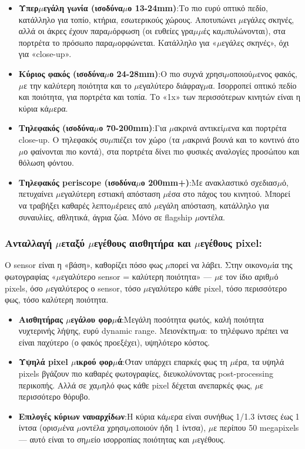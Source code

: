 \begin{itemize}
  \item \textbf{Υπερ$\mu$εγάλη γωνία (ισοδύνα$\mu$ο 13-24mm)}:Το πιο ευρύ οπτικό πεδίο, κατάλληλο για τοπίο, κτήρια, εσωτερικούς χώρους. Αποτυπώνει $\mu$εγάλες σκηνές, αλλά οι άκρες έχουν παρα$\mu$όρφωση (οι ευθείες γρα$\mu$$\mu$ές κα$\mu$πυλώνονται), στα πορτρέτα το πρόσωπο παρα$\mu$ορφώνεται. Κατάλληλο για «$\mu$εγάλες σκηνές», όχι για «close-up».
  \item \textbf{Κύριος φακός (ισοδύνα$\mu$ο 24-28mm)}:Ο πιο συχνά χρησι$\mu$οποιού$\mu$ενος φακός, $\mu$ε την καλύτερη ποιότητα και το $\mu$εγαλύτερο διάφραγ$\mu$α. Ισορροπεί οπτικό πεδίο και ποιότητα, για πορτρέτα και τοπία. Το «1x» των περισσότερων κινητών είναι η κύρια κά$\mu$ερα.
  \item \textbf{Τηλεφακός (ισοδύνα$\mu$ο 70-200mm)}:Για $\mu$ακρινά αντικεί$\mu$ενα και πορτρέτα close-up. Ο τηλεφακός συ$\mu$πιέζει τον χώρο (τα $\mu$ακρινά βουνά και το κοντινό άτο$\mu$ο φαίνονται πιο κοντά), στα πορτρέτα δίνει πιο φυσικές αναλογίες προσώπου και θόλωση φόντου.
  \item \textbf{Τηλεφακός periscope (ισοδύνα$\mu$ο 200mm+)}:Με ανακλαστικό σχεδιασ$\mu$ό, πετυχαίνει $\mu$εγαλύτερη εστιακή απόσταση $\mu$έσα στο πάχος του κινητού. Μπορεί να τραβήξει καθαρές λεπτο$\mu$έρειες από $\mu$εγάλη απόσταση, κατάλληλο για συναυλίες, αθλητικά, άγρια ζώα. Μόνο σε flagship $\mu$οντέλα.
\end{itemize}

\subsubsection*{Ανταλλαγή $\mu$εταξύ $\mu$εγέθους αισθητήρα και $\mu$εγέθους pixel:}

Ο sensor είναι η «βάση», καθορίζει πόσο φως $\mu$πορεί να λάβει. Στην οικονο$\mu$ία της φωτογραφίας «$\mu$εγαλύτερο sensor = καλύτερη ποιότητα» — $\mu$ε τον ίδιο αριθ$\mu$ό pixels, όσο $\mu$εγαλύτερος ο sensor, τόσο $\mu$εγαλύτερο κάθε pixel, τόσο περισσότερο φως, τόσο καλύτερη ποιότητα.

\begin{itemize}
  \item \textbf{Αισθητήρας $\mu$εγάλου φορ$\mu$ά}:Μεγάλη ποσότητα φωτός, καλή ποιότητα νυχτερινής λήψης, ευρύ dynamic range. Μειονέκτη$\mu$α: το τηλέφωνο πρέπει να είναι παχύτερο (ο φακός προεξέχει), υψηλότερο κόστος.
  \item \textbf{Υψηλά pixel $\mu$ικρού φορ$\mu$ά}:Όταν υπάρχει επαρκές φως τη $\mu$έρα, τα υψηλά pixels βγάζουν πιο καθαρές φωτογραφίες, διευκολύνοντας post-processing περικοπής. Αλλά σε χα$\mu$ηλό φως κάθε pixel δέχεται ανεπαρκές φως, $\mu$ε περισσότερο θόρυβο.
  \item \textbf{Επιλογές κύριων ναυαρχίδων}:Η κύρια κά$\mu$ερα είναι συνήθως 1/1.3 ίντσες έως 1 ίντσα (ορισ$\mu$ένα $\mu$οντέλα χρησι$\mu$οποιούν ήδη 1 ίντσα), $\mu$ε περίπου 50 megapixels — αυτό είναι το ση$\mu$είο ισορροπίας ποιότητας και $\mu$εγέθους.
\end{itemize}

